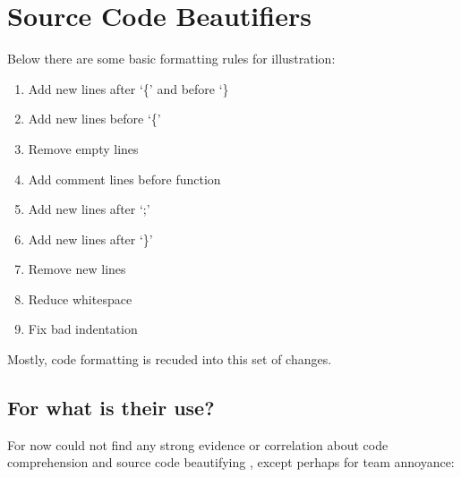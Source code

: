 

%


\label{source_code_beautifiers}
\chapter{Source Code Beautifiers}


    Below there are some basic formatting rules for illustration:

    \medskip
    \begin{enumerate}
        \item Add new lines after `\{' and before `\}
        \item Add new lines before `\{'
        \item Remove empty lines
        \item Add comment lines before function
        \item Add new lines after `;'
        \item Add new lines after `\}'
        \item Remove new lines
        \item Reduce whitespace
        \item Fix bad indentation
    \end{enumerate}
    \vspace{-4mm}\begin{flushright}\textcite{prettyPrinter}\end{flushright}

    Mostly,
    code formatting is recuded into this set of changes.



    \section{For what is their use?}

    For now could not find any strong evidence or correlation about code
    comprehension and source code beautifying \cite{improvingCodeReadability},
    except perhaps for team annoyance:

